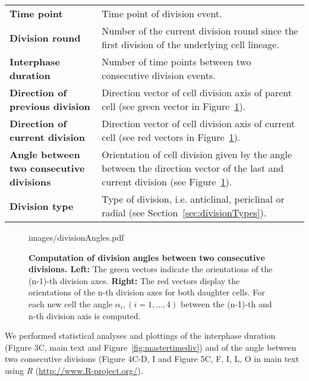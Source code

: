 \documentclass[11pt,a4paper, final]{article}
\begin{document}
\noindent
\begin{tabularx}{\textwidth}{@{} >{\RaggedRight}p{6.8cm} X @{}}
\textbf{Time point} &
Time point of division event.\\
\textbf{Division round} &
Number of the current division round since the first division of the underlying cell lineage.\\
\textbf{Interphase duration}&
Number of time points between two consecutive division events.\\
\textbf{Direction of previous division} &
Direction vector of cell division axis of parent cell  (see green vector in Figure~\ref{fig:divisionAngles}).\\
\textbf{Direction of current division} &
Direction vector of cell division axis of current cell  (see red vectors in Figure~\ref{fig:divisionAngles}).\\
\textbf{Angle between two consecutive divisions}&
Orientation of cell division given by the angle between the direction vector of the last and current division (see Figure~\ref{fig:divisionAngles}).\\
\textbf{Division type} &
Type of division, i.e. anticlinal, periclinal or radial (see Section~\ref{sec:divisionTypes}).\\
\end{tabularx}
%
\begin{figure}[htbp]
	\begin{center}
		\begin{overpic}[width=0.7\linewidth]{images/divisionAngles.pdf}
		\end{overpic}
\caption[]
{
{\bf Computation of division angles between two consecutive divisions. Left:} The green vectors indicate the orientations of the (n-1)-th division axes. \textbf{Right:} The red vectors display the orientations of the n-th division axes for both daughter cells. For each new cell the angle $\alpha_i, (i=1,\ldots,4)$ between the (n-1)-th and n-th division axis is computed.
}
	\label{fig:divisionAngles}
	\end{center}
\end{figure}
%

\noindent
We performed statistical analyses and plottings of the interphase duration (Figure 3C, main text and Figure~\ref{fig:mastertimediv}) and of the angle between two consecutive divisions (Figure 4C-D, I and Figure 5C, F, I, L, O in main text using \textit{R} (\href{http://www.R-project.org/}{http://www.R-project.org/}).

\clearpage
\end{document}

